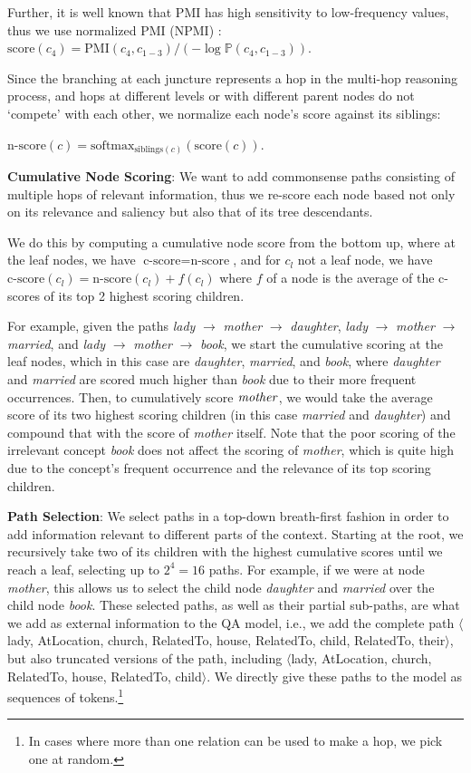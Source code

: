 \documentclass[11pt,a4paper]{article}
\newcommand{\softmax}{\text{softmax}}
\newcommand{\prob}{\mathbb{P}}
\begin{document}
Further, it is well known that PMI has high sensitivity to low-frequency values, thus we use normalized PMI (NPMI) \cite{bouma2009normalized}:
$\text{score}(c_4) 
				  = \text{PMI}(c_4, c_{1-3}) / (-\log\prob(c_4, c_{1-3}))$.

Since the branching at each juncture represents a hop in the multi-hop reasoning process, and hops at different levels or with different parent nodes do not `compete' with each other, we normalize each node's score against its siblings:

\vspace{5pt}
$\text{n-score}(c) = \softmax_{\text{siblings}(c)}(\text{score}(c))$.
\vspace{5pt}

\noindent\textbf{Cumulative Node Scoring}:
We want to add commonsense paths consisting of multiple hops of relevant information, thus we re-score each node based not only on its relevance and saliency but also that of its tree descendants. 

We do this by computing a cumulative node score from the bottom up, where at the leaf nodes, we have $\text{c-score} = \text{n-score}$, and for $c_l$ not a leaf node, we have
$\text{c-score}(c_l) = \text{n-score}(c_l) + f(c_l)$
where $f$ of a node is the average of the c-scores of its top 2 highest scoring children.

For example, given the paths {\it lady} $\rightarrow$ {\it mother} $\rightarrow$ {\it daughter}, {\it lady} $\rightarrow$ {\it mother} $\rightarrow$ {\it married}, and {\it lady} $\rightarrow$ {\it mother} $\rightarrow$ {\it book}, we start the cumulative scoring at the leaf nodes, which in this case are {\it daughter}, {\it married}, and {\it book}, where  {\it daughter} and {\it married} are scored much higher than {\it book} due to their more frequent occurrences. Then, to cumulatively score ${\it mother}$, we would take the average score of its two highest scoring children (in this case {\it married} and {\it daughter})  and compound that with the score of {\it mother} itself. Note that the poor scoring of the irrelevant concept {\it book} does not affect the scoring of {\it mother}, which is quite high due to the concept's frequent occurrence and the relevance of its top scoring children.

\noindent\textbf{Path Selection}:
We select paths in a top-down breath-first fashion in order to add information relevant to different parts of the context.
Starting at the root, we recursively take two of its children with the highest cumulative scores until we reach a leaf, selecting up to $2^4=16$ paths. For example, if we were at node {\it mother}, this allows us to select the child node {\it daughter} and {\it married} over the child node {\it book}.
These selected paths, as well as their partial sub-paths, are what we add as external information to the QA model, i.e., we add the complete path $\langle$lady, AtLocation, church, RelatedTo, house, RelatedTo, child, RelatedTo, their$\rangle$, but also truncated versions of the path, including $\langle$lady, AtLocation, church, RelatedTo, house, RelatedTo, child$\rangle$.
We directly give these paths to the model as sequences of tokens.\footnote{In cases where more than one relation can be used to make a hop, we pick one at random.}
\end{document}
